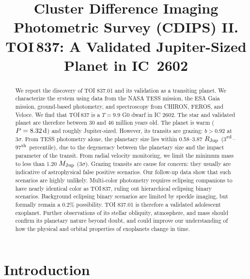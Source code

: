 \documentclass[12pt,twocolumn,tighten]{aastex63}
\begin{document}

\title{
  Cluster Difference Imaging Photometric Survey (CDIPS) II.
  TOI$\,$837: A Validated Jupiter-Sized Planet in IC~2602
}

\suppressAffiliations


\begin{abstract}
  We report the discovery of TOI 837.01 and its validation as a
  transiting planet.  We characterize the system using data from the
  NASA TESS mission, the ESA Gaia mission, ground-based photometry,
  and spectroscopy from CHIRON, FEROS, and Veloce.  We find that
  TOI$\,$837 is a $T=9.9$ G0 dwarf in IC 2602.  The star and validated
  planet are therefore between 30 and 46 million years old.  The
  planet is warm ($P = 8.32\,{\rm d}$) and roughly Jupiter-sized.
  However, its transits are grazing: $b > 0.92$ at 3$\sigma$.  From
  TESS photometry alone, the planetary size lies within 0.58--3.87
  $R_{\rm Jup}$ (3$^{\rm rd}$--97$^{\rm th}$ percentile), due to the
  degeneracy between the planetary size and the impact parameter of
  the transit.  From radial velocity monitoring, we limit the minimum
  mass to less than 1.20 $M_{\rm Jup}$ (3$\sigma$).  Grazing transits
  are cause for concern: they usually are indicative of astrophysical
  false positive scenarios.  Our follow-up data show that such
  scenarios are highly unlikely.  Multi-color photometry requires
  eclipsing companions to have nearly identical color as TOI$\,$837,
  ruling out hierarchical eclipsing binary scenarios.  Background
  eclipsing binary scenarios are limited by speckle imaging, but
  formally remain a 0.2\% possibility.  TOI 837.01 is therefore a
  validated adolescent exoplanet.  Further observations of its stellar
  obliquity, atmosphere, and mass should confirm its planetary nature
  beyond doubt, and could improve our understanding of how the
  physical and orbital properties of exoplanets change in time.
\end{abstract}




\section{Introduction}
\end{document}

